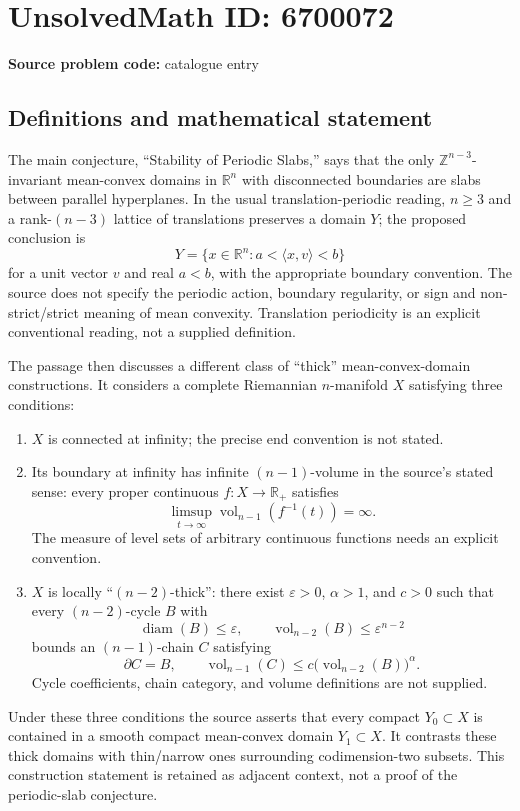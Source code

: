 \documentclass[11pt]{article}
\newcommand{\Z}{\mathbb{Z}}
\newcommand{\R}{\mathbb{R}}
\begin{document}
\section*{UnsolvedMath ID: 6700072}
\textbf{Source problem code:} catalogue entry
\subsection{Definitions and mathematical statement}
The main conjecture, ``Stability of Periodic Slabs,'' says that the only $\Z^{n-3}$-invariant mean-convex domains in $\R^n$ with disconnected boundaries are slabs between parallel hyperplanes. In the usual translation-periodic reading, $n\ge3$ and a rank-$(n-3)$ lattice of translations preserves a domain $Y$; the proposed conclusion is
\[
 Y=\{x\in\R^n:a<\langle x,v\rangle<b\}
\]
for a unit vector $v$ and real $a<b$, with the appropriate boundary convention. The source does not specify the periodic action, boundary regularity, or sign and non-strict/strict meaning of mean convexity. Translation periodicity is an explicit conventional reading, not a supplied definition.

The passage then discusses a different class of ``thick'' mean-convex-domain constructions. It considers a complete Riemannian $n$-manifold $X$ satisfying three conditions:
\begin{enumerate}
\item $X$ is connected at infinity; the precise end convention is not stated.
\item Its boundary at infinity has infinite $(n-1)$-volume in the source's stated sense: every proper continuous $f:X\to\R_+$ satisfies
\[
 \limsup_{t\to\infty}\operatorname{vol}_{n-1}(f^{-1}(t))=\infty.
\]
The measure of level sets of arbitrary continuous functions needs an explicit convention.
\item $X$ is locally ``$(n-2)$-thick'': there exist $\varepsilon>0$, $\alpha>1$, and $c>0$ such that every $(n-2)$-cycle $B$ with
\[
 \operatorname{diam}(B)\le\varepsilon,\qquad
 \operatorname{vol}_{n-2}(B)\le\varepsilon^{n-2}
\]
bounds an $(n-1)$-chain $C$ satisfying
\[
 \partial C=B,\qquad
 \operatorname{vol}_{n-1}(C)\le
                  c\bigl(\operatorname{vol}_{n-2}(B)\bigr)^\alpha.
\]
Cycle coefficients, chain category, and volume definitions are not supplied.
\end{enumerate}
Under these three conditions the source asserts that every compact $Y_0\subset X$ is contained in a smooth compact mean-convex domain $Y_1\subset X$. It contrasts these thick domains with thin/narrow ones surrounding codimension-two subsets. This construction statement is retained as adjacent context, not a proof of the periodic-slab conjecture.
\end{document}
